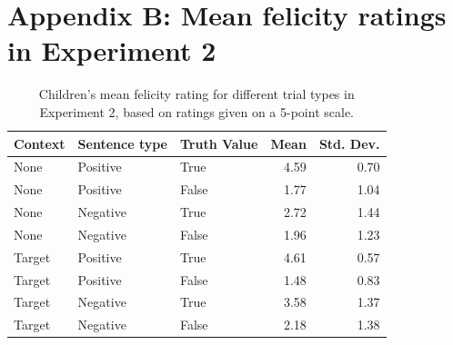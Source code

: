 \documentclass[man, noapacite]{apa2}
\begin{document}
\newpage

\section{Appendix B: Mean felicity ratings in Experiment 2}\label{appendix:exp2}

\begin{table}[h!]
\caption{\label{tab:m3} Children's mean felicity rating for different trial types in Experiment 2, based on ratings given on a 5-point scale.}
\begin{center}
\small\addtolength{\tabcolsep}{-5pt}
\begin{tabular}{lllrr}
 \hline
 Context & Sentence type & Truth Value & Mean & Std. Dev. \\
 \hline
 None & Positive & True & 4.59 & 0.70\\
 None & Positive & False & 1.77 & 1.04\\
 None & Negative & True & 2.72 & 1.44 \\
 None & Negative & False & 1.96 &1.23 \\
 Target & Positive & True & 4.61 & 0.57\\
 Target & Positive & False & 1.48 & 0.83 \\
 Target & Negative & True & 3.58 & 1.37 \\
 Target & Negative & False & 2.18 & 1.38\\
 \hline
\end{tabular}
\end{center}
\end{table}
\end{document}
